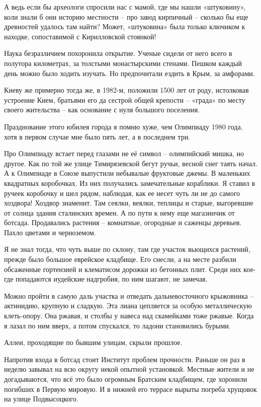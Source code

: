 А ведь если бы археологи спросили нас с мамой, где мы нашли «штуковину», коли знали б они историю местности – про завод кирпичный – сколько бы еще древностей удалось там найти? Может, «штуковина» была только ключиком к находке, сопоставимой с Кирилловской стоянкой! 

Наука безразличием похоронила открытие. Ученые сидели от него всего в полутора километрах, за толстыми монастырскими стенами. Пешком каждый день можно было ходить изучать. Но предпочитали ездить в Крым, за амфорами.

Киеву же примерно тогда же, в 1982-м, положили 1500 лет от роду, истолковав устроение Кием, братьями его да сестрой общей крепости – «града» по месту своего жительства – как основание с нуля большого поселения.

Празднование этого юбилея города я помню хуже, чем Олимпиаду 1980 года, хотя в первом случае мне было пять лет, а в последнем три. 

Про Олимпиаду встает перед глазами не её символ – олимпийский мишка, но другое. Как по той же улице Тимирязевской бегут ручьи, весной снег таять начал. А к Олимпиаде в Союзе выпустили небывалые фруктовые джемы. В маленьких квадратных коробочках. Из них получались замечательные кораблики. Я ставил в ручеек коробочку и шел рядом, наблюдая, как ее несет чуть ли не до самого хоздвора! Хоздвор знаменит. Там сеялки, веялки, теплицы и старые, выгоревшие от солнца здания сталинских времен. А по пути к нему еще магазинчик от ботсада. Продавались растения – комнатные, огородные и саженцы деревьев. Пахло цветами и черноземом.

Я не знал тогда, что чуть выше по склону, там где участок вьющихся растений, прежде было большое еврейское кладбище. Его снесли, а на месте разбили обсаженные гортензией и клематисом дорожки из бетонных плит. Среди них кое-где попадаются иудейские надгробия, по ним шагают, не замечая.

Можно пройти в самую даль участка и отведать дальневосточного крыжовника – актинидию, крупную и сладкую. Эта лиана цепляется за особую металлическую клеть-опору. Она ржавая, и столбы у навеса над скамейками тоже ржавые. Когда я лазал по ним вверх, а потом спускался, то ладони становились бурыми.

Аллеи, проходящие по бывшим улицам, скрыли прошлое. 

Напротив входа в ботсад стоит Институт проблем прочности. Раньше он раз в неделю завывал на всю округу некой опытной установкой. Местные жители и не догадываются, что всё это было огромным Братским кладбищем, где хоронили погибших в Первую мировую. И в нижней его террасе вырыты погреба хрущовок на улице Подвысоцкого. 

